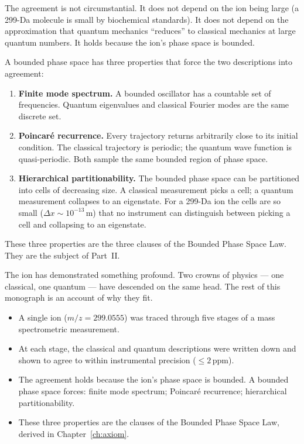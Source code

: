 The agreement is not circumstantial.
It does not depend on the ion being large (a 299-Da molecule is small by
biochemical standards).
It does not depend on the approximation that quantum mechanics ``reduces'' to
classical mechanics at large quantum numbers.
It holds because the ion's phase space is bounded.

A bounded phase space has three properties that force the two descriptions into
agreement:
\begin{enumerate}
  \item \textbf{Finite mode spectrum.}
    A bounded oscillator has a countable set of frequencies.
    Quantum eigenvalues and classical Fourier modes are the same discrete set.
  \item \textbf{Poincaré recurrence.}
    Every trajectory returns arbitrarily close to its initial condition.
    The classical trajectory is periodic; the quantum wave function is
    quasi-periodic.
    Both sample the same bounded region of phase space.
  \item \textbf{Hierarchical partitionability.}
    The bounded phase space can be partitioned into cells of decreasing size.
    A classical measurement picks a cell; a quantum measurement collapses to an
    eigenstate.
    For a 299-Da ion the cells are so small ($\Delta x \sim 10^{-13}$\,m)
    that no instrument can distinguish between picking a cell and collapsing
    to an eigenstate.
\end{enumerate}

These three properties are the three clauses of the Bounded Phase Space Law.
They are the subject of Part~II.

\bigskip
The ion has demonstrated something profound.
Two crowns of physics --- one classical, one quantum --- have descended on the
same head.
The rest of this monograph is an account of why they fit.

\vspace{2ex}
\begin{tcolorbox}[colback=crownblue!5, colframe=crownblue!60!black,
                  title={\textbf{Chapter 1 Summary}}]
\begin{itemize}[noitemsep]
  \item A single ion ($m/z = 299.0555$) was traced through five stages of a
    mass spectrometric measurement.
  \item At each stage, the classical and quantum descriptions were written down
    and shown to agree to within instrumental precision ($\leq 2\,\mathrm{ppm}$).
  \item The agreement holds because the ion's phase space is bounded.
    A bounded phase space forces: finite mode spectrum; Poincaré recurrence;
    hierarchical partitionability.
  \item These three properties are the clauses of the Bounded Phase Space Law,
    derived in Chapter~\ref{ch:axiom}.
\end{itemize}
\end{tcolorbox}
